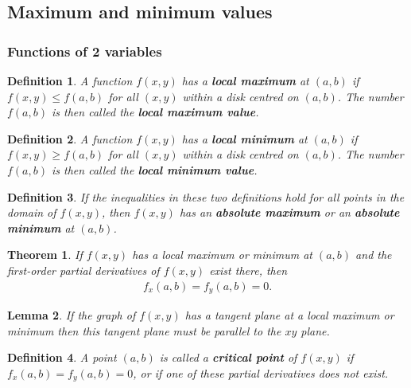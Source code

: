 \documentclass{article}
\theoremstyle{sltheorem}
\newtheorem{definition}{Definition}[section]
\newtheorem{theorem}{Theorem}[section]
\newtheorem{lemma}[theorem]{Lemma}
\newcommand*\B[1]{\textbf{#1}}
\begin{document}
\subsection{Maximum and minimum values}
\subsubsection{Functions of 2 variables}
\begin{definition}
    A function $f(x,y)$ has a \B{local maximum} at $(a,b)$ if $f(x,y)\leq f(a,b)$
    for all $(x,y)$ within a disk centred on $(a,b)$. The number $f(a,b)$
    is then called the \B{local maximum value}.
\end{definition}
\begin{definition}
    A function $f(x,y)$ has a \B{local minimum} at $(a,b)$ if $f(x,y)\geq f(a,b)$
    for all $(x,y)$ within a disk centred on $(a,b)$. The number $f(a,b)$
    is then called the \B{local minimum value}.
\end{definition}
\begin{definition}
    If the inequalities in these two definitions hold for all points in the
    domain of $f(x,y)$, then $f(x,y)$ has an \B{absolute maximum} or an
    \B{absolute minimum} at $(a,b)$.
\end{definition}
\begin{theorem}
    If $f(x,y)$ has a local maximum or minimum at $(a,b)$ and the first-order
    partial derivatives of $f(x,y)$ exist there, then
    \begin{align*}
        f_x(a,b) = f_y(a,b) = 0.
    \end{align*}
\end{theorem}
\begin{lemma}
    If the graph of $f(x,y)$ has a tangent plane at a local maximum or minimum
    then this tangent plane must be parallel to the $xy$ plane.
\end{lemma}
\begin{definition}
    A point $(a,b)$ is called a \B{critical point} of $f(x,y)$ if
    $f_x(a,b)=f_y(a,b)=0$, or if one of these partial derivatives does not exist.
\end{definition}
\end{document}
